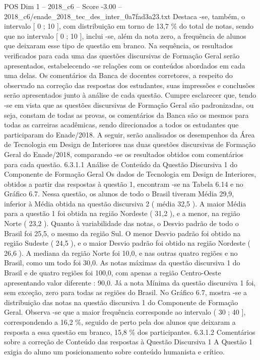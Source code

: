 \begin{textsample}{POS Dim 1 – 2018\_c6 – Score -3.00 – 2018\_c6/enade\_2018\_tec\_des\_inter\_0a7fad3a23.txt}
Destaca -se, também, o intervalo [ 0 ; 10 ], com distribuição em torno de 13,7 \% do total de notas, sendo que no intervalo [ 0 ; 10 ], inclui -se, além da nota zero, a frequência de alunos que deixaram esse tipo de questão em branco.
Na sequência, os resultados verificados para cada uma das questões discursivas de Formação Geral serão apresentados, estabelecendo -se relações com os conteúdos abordados em cada uma delas.
Os comentários da Banca de docentes corretores, a respeito do observado na correção das respostas dos estudantes, suas impressões e conclusões serão apresentados junto à análise de cada questão.
Cumpre esclarecer que, tendo -se em vista que as questões discursivas de Formação Geral são padronizadas, ou seja, constam de todas as provas, os comentários da Banca são os mesmos para todas as carreiras acadêmicas, sendo direcionados a todos os estudantes que participaram do Enade/2018.
A seguir, serão analisados os desempenhos da Área de Tecnologia em Design de Interiores nas duas questões discursivas de Formação Geral do Enade/2018, comparando -se os resultados obtidos com comentários para cada questão. 6.3.1.1 Análise de Conteúdo da Questão Discursiva 1 do Componente de Formação Geral Os dados de Tecnologia em Design de Interiores, obtidos a partir das respostas à questão 1, encontram -se na Tabela 6.14 e no Gráfico 6.7.
Nessa questão, os alunos de todo o Brasil tiveram Média 29,9, inferior à Média obtida na questão discursiva 2 ( média 32,5 ).
A maior Média para a questão 1 foi obtida na região Nordeste ( 31,2 ), e a menor, na região Norte ( 23,2 ).
Quanto à variabilidade das notas, o Desvio padrão de todo o Brasil foi 25,5, o mesmo da região Sul.
O menor Desvio padrão foi obtido na região Sudeste ( 24,5 ), e o maior Desvio padrão foi obtido na região Nordeste ( 26,6 ).
A mediana da região Norte foi 10,0, e nas outras quatro regiões e no Brasil, como um todo foi 30,0.
As notas máximas da questão discursiva 1 do Brasil e de quatro regiões foi 100,0, com apenas a região Centro-Oeste apresentando valor diferente : 90,0.
Já a nota Mínima da questão discursiva 1 foi, sem exceção, zero para todas as regiões do Brasil.
No Gráfico 6.7, mostra -se a distribuição das notas na questão discursiva 1 do Componente de Formação Geral.
Observa -se que a maior frequência corresponde ao intervalo ( 30 ; 40 ], correspondendo a 16,2 \%, seguido de perto pela dos alunos que deixaram a resposta a essa questão em branco, 15,8 \% dos participantes. 6.3.1.2 Comentários sobre a correção de Conteúdo das respostas à Questão Discursiva 1 A Questão 1 exigia do aluno um posicionamento sobre conteúdo humanista e crítico.

\end{textsample}
